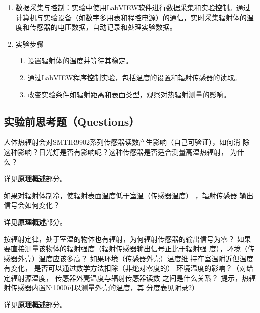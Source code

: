 \documentclass[dvipsnames, svgnames,a4paper,11pt]{article}
\begin{document}
\begin{enumerate}
\begin{itemize}
\begin{enumerate}
					\item \textbf{实验验证：}
					\begin{itemize}
						\item 通过实验数据，验证辐射强度与材料厚度的指数衰减关系是否成立。
						\item 通过斜率 \(\mu\)，可以进一步了解材料的防辐射性能，较大的 \(\mu\) 值意味着更强的辐射吸收能力。
					\end{itemize}
				\end{enumerate}
				
		\end{itemize}		
		\item 数据采集与控制：实验中使用LabVIEW软件进行数据采集和实验控制。通过计算机与实验设备（如数字多用表和程控电源）的通信，实时采集辐射体的温度和传感器的电压数据，自动记录和处理实验数据。
		
		\item 实验步骤
		
		\begin{enumerate}
			\item 设置辐射体的温度并等待其稳定。
			\item 通过LabVIEW程序控制实验，包括温度的设置和辐射传感器的读取。
			\item 改变实验条件如辐射距离和表面类型，观察对热辐射测量的影响。
		\end{enumerate}
	\end{enumerate}
	
	
	
	
	
	\subsection{实验前思考题（Questions）}
	
	\begin{question}
		人体热辐射会对SMTIR9902系列传感器读数产生影响（自己可验证），如何消
		除这种影响？日光灯是否有影响呢？这种传感器是否适合测量高温热辐射，
		为什么？
	\end{question}
	详见\textbf{原理概述}部分。
	
	\begin{question}
		如果对辐射体制冷，使辐射表面温度低于室温（传感器温度） ，辐射传感器
		输出信号会如何变化？
	\end{question}
	详见\textbf{原理概述}部分。
	
	\begin{question}
		按辐射定律，处于室温的物体也有辐射，为何辐射传感器的输出信号为零？
		如果要直接测量该物体的辐射强度（辐射传感器输出信号正比于辐射强
		度），环境（传感器外壳）温度应该多高？ 如果环境（传感器外壳）温度维
		持在室温附近但温度有变化， 是否可以通过数学方法扣除（非绝对零度的）
		环境温度的影响？（对给定辐射源温度， 传感器外壳温度与辐射传感器读数
		之间是什么关系？ 提示，热辐射传感器内置Ni1000可以测量外壳的温度，其
		分度表见附录2）
	\end{question}
	详见\textbf{原理概述}部分。
	
\end{document}
